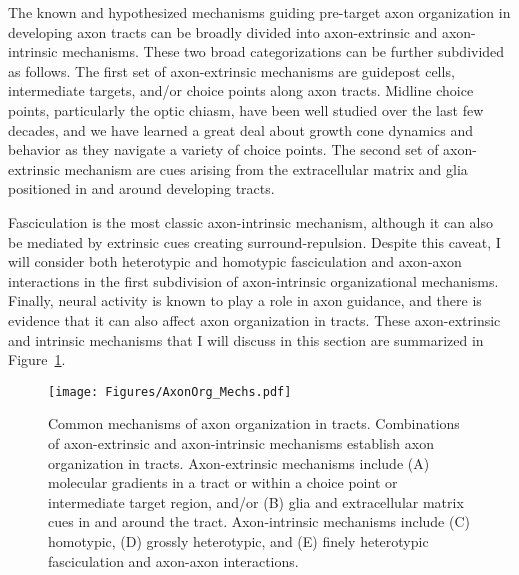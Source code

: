\label{sec:MoleculesMechanisms}
The known and hypothesized mechanisms guiding pre-target axon organization in developing axon tracts can be broadly divided into axon-extrinsic and axon-intrinsic mechanisms.
These two broad categorizations can be further subdivided as follows.
The first set of axon-extrinsic mechanisms are guidepost cells, intermediate targets, and/or choice points along axon tracts.
Midline choice points, particularly the optic chiasm, have been well studied over the last few decades, and we have learned a great deal about growth cone dynamics and behavior as they navigate a variety of choice points.
The second set of axon-extrinsic mechanism are cues arising from the extracellular matrix and glia positioned in and around developing tracts.

Fasciculation is the most classic axon-intrinsic mechanism, although it can also be mediated by extrinsic cues creating surround-repulsion.
Despite this caveat, I will consider both heterotypic and homotypic fasciculation and axon-axon interactions in the first subdivision of axon-intrinsic organizational mechanisms.
Finally, neural activity is known to play a role in axon guidance, and there is evidence that it can also affect axon organization in tracts.
These axon-extrinsic and intrinsic mechanisms that I will discuss in this section are summarized in Figure~\ref{AxonOrg_Mechs}.
\begin{figure}[hbtp]
    \begin{center}
    \texttt{[image: Figures/AxonOrg\_Mechs.pdf]}
    \caption[Common mechanisms of axon organization in tracts.]
    {Common mechanisms of axon organization in tracts.
    Combinations of axon-extrinsic and axon-intrinsic mechanisms establish axon organization in tracts.
    Axon-extrinsic mechanisms include (A) molecular gradients in a tract or within a choice point or intermediate target region, and/or (B) glia and extracellular matrix cues in and around the tract.
    Axon-intrinsic mechanisms include (C) homotypic, (D) grossly heterotypic, and (E) finely heterotypic fasciculation and axon-axon interactions.}
    \label{AxonOrg_Mechs}
    \end{center}
\end{figure}

